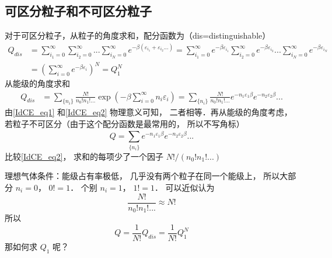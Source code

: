
\subsection{可区分粒子和不可区分粒子}
对于可区分粒子，从粒子的角度求和，配分函数为（dis=distinguishable）
  \begin{equation}\label{IdCE_eq1}
    \begin{aligned}
    {Q_{dis}} & = \sum\limits_{{i_1} = 0}^\infty  {\sum\limits_{{i_2} = 0}^\infty  {...\sum\limits_{{i_N} = 0}^\infty  {{e^{ - \beta ({\varepsilon _{{i_1}}} + {\varepsilon _{{i_2}}}...)}}} } } = \sum\limits_{{i_1} = 0}^\infty  {{e^{ - \beta {\varepsilon _{{i_1}}}}}} \sum\limits_{{i_2} = 0}^\infty  {{e^{ - \beta {\varepsilon _{{i_2}}}}}} ...\sum\limits_{{i_N} = 0}^\infty  {{e^{ - \beta {\varepsilon _{{i_N}}}}}} \\
      & = {\left( {\sum\limits_{i = 0}^\infty  {{e^{ - \beta {\varepsilon _i}}}} } \right)^N}= Q_1^N
\end{aligned}
\end{equation}
从能级的角度求和
\begin{equation}\label{IdCE_eq2}
\begin{aligned}
{Q_{dis}} & = \sum\limits_{\{ {n_i}\} }^{} {\frac{{N!}}{{{n_0}!{n_1}!...}}\exp \left( { - \beta \sum\limits_{i = 0}^\infty  {{n_i}{\varepsilon _i}} } \right)} = \sum\limits_{\{ {n_i}\} }^{} {\frac{{N!}}{{{n_0}!{n_1}!...}}{e^{ - {n_1}{\varepsilon _1}\beta }}{e^{ - {n_2}{\varepsilon _2}\beta }}...}
\end{aligned}
\end{equation}
由\autoref{IdCE_eq1} 和\autoref{IdCE_eq2} 物理意义可知， 二者相等．再从能级的角度考虑， 若粒子不可区分（由于这个配分函数是最常用的， 所以不写角标）
\begin{equation}\label{IdCE_eq3}
Q = \sum\limits_{\{ {n_i}\} }^{} {{e^{ - {n_1}{\varepsilon _1}\beta }}{e^{ - {n_2}{\varepsilon _2}\beta }}...}
\end{equation}
比较\autoref{IdCE_eq2}，  求和的每项少了一个因子 ${{N!}}/({{{n_0}!{n_1}!...}})$

理想气体条件：能级占有率极低， 几乎没有两个粒子在同一个能级上， 所以大部分 ${n_i} = 0$，  $0! = 1$．  个别 ${n_i} = 1$，  $1! = 1$．
可以近似认为
\begin{equation}
\frac{{N!}}{{{n_0}!{n_1}!...}} \approx N!
\end{equation}
所以
  \begin{equation}
    Q = \frac{1}{{N!}}{Q_{dis}} = \frac{1}{{N!}}Q_1^N
  \end{equation}
  那如何求 $Q_1$ 呢？ 

